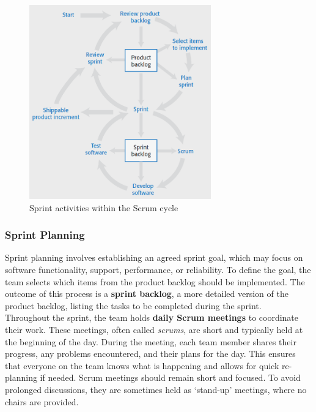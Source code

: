 \begin{figure} [H]
    \centering
    \includegraphics[width=0.7\textwidth]{images/Agile/ScrumCycle.png}
    \caption{Sprint activities within the Scrum cycle}
    \label{fig:scrumcycle}
\end{figure} 

\subsubsection{Sprint Planning}

Sprint planning involves establishing an agreed sprint goal, which may focus on software functionality, support, performance, or reliability. To define the goal, the team selects which items from the product backlog should be implemented. The outcome of this process is a \textbf{sprint backlog}, a more detailed version of the product backlog, listing the tasks to be completed during the sprint. \\

Throughout the sprint, the team holds \textbf{daily Scrum meetings} to coordinate their work. These meetings, often called \emph{scrums}, are short and typically held at the beginning of the day. During the meeting, each team member shares their progress, any problems encountered, and their plans for the day. This ensures that everyone on the team knows what is happening and allows for quick re-planning if needed. Scrum meetings should remain short and focused. To avoid prolonged discussions, they are sometimes held as ‘stand-up’ meetings, where no chairs are provided. \\

